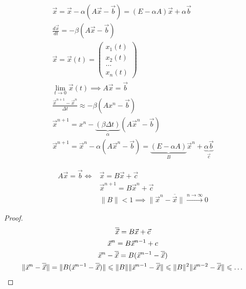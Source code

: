 \begin{gather*}
  \vec{x} = \vec{x} - \alpha(A\vec{x} - \vec{b}) = (E - \alpha A) \vec{x} +
  \alpha \vec{b}\\
  \frac{d\vec{x}}{dt} = - \beta (A \vec{x} - \vec{b})\\
  \vec{x} = \vec{x}(t) = \begin{pmatrix}
    x_1(t)\\
    x_2(t)\\
    \dots\\
    x_n(t)
  \end{pmatrix} \\
  \lim_{t \to 0} \vec{x}(t) \implies A\vec{x} = \vec{b} \\
  \frac{\vec{x}^{n + 1} - \vec{x}^n}{\Delta t} \approx - \beta (Ax^n -
  \vec{b}) \\
  \vec{x}^{n + 1} = x^n - \underbrace{(\beta \Delta t)}_{\alpha} (A\vec{x}^n
  - \vec{b}) \\
  \vec{x}^{n + 1} = \vec{x}^n - \alpha (A \vec{x}^n - \vec{b}) = \underbrace{(E
    - \alpha A)}_{B} \vec{x}^n + \underbrace{\alpha \vec{b}}_{\vec{c}}
\end{gather*}

\begin{note}
  \begin{align*}
    A \vec{x} = \vec{b} \iff &\vec{x} = B\vec{x} + \vec{c}\\
                             &\vec{x}^{n + 1} = B\vec{x}^n + \vec{c}\\
                             &\|B\| < 1 \implies \|\vec{x}^n - \overline{\vec{x}}\| \xrightarrow{n \to \infty} 0
  \end{align*}
\end{note}

\begin{proof}
  \begin{gather*}
    \overline{\vec{x}} = B \vec{x}+ \vec{c}\\
    \vec{x}^n = B \vec{x}^{n - 1} + c\\
    \vec{x}^n - \overline{\vec{x}} = B (\vec{x}^{n - 1} -\overline{\vec{x}}) \\
    \|\vec{x}^n - \overline{\vec{x}}\| = \|B(\vec{x}^{n - 1}
    -\overline{\vec{x}})\| \leq \|B\|\|\vec{x}^{n - 1} - \overline{\vec{x}}\|
    \leq \|B\|^2 \|\vec{x}^{n - 2} - \overline{\vec{x}}\| \leq \dots \qedhere
  \end{gather*}
\end{proof}


